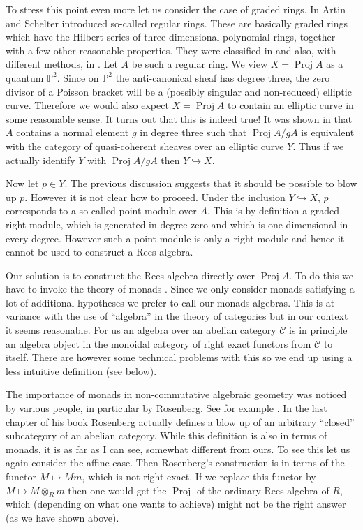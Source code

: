 \documentclass{amsproc}
\def \PP{{\mathbb P}}
\def\Cscr{{\mathcal C}}
\def\Proj{\operatorname {Proj}}
\theoremstyle{definition}
\theoremstyle{remark}
\numberwithin{equation}{section}
\numberwithin{table}{section}
\numberwithin{figure}{section}
\begin{document}
To stress this point even more let us consider the case of graded
rings. In \cite{AS} Artin and Schelter introduced so-called regular
rings. These are basically graded rings which have the Hilbert series
of three dimensional polynomial rings, together with a few other
reasonable properties. They were classified in \cite{AS,ATV1,ATV2} and
also, with different methods, in \cite{Bondal}. Let $A$ be such a
regular ring. We view $X= \Proj A$ as a quantum $\PP^2$. Since
on $\PP^2$ the anti-canonical sheaf has degree three, the zero divisor
of a Poisson bracket will be a (possibly singular and non-reduced)
elliptic curve. Therefore we would also expect $X=\Proj A$ to contain
an elliptic curve in some reasonable sense. It turns out that this is
indeed true!  It was shown in \cite{AS,AVdB,ATV1} that $A$
contains a normal element $g$ in degree three such that $\Proj A/gA$
is equivalent with the category of quasi-coherent sheaves over an
elliptic curve $Y$. Thus if we actually identify $Y$ with $\Proj A/gA$
then $Y\hookrightarrow X$.

Now let $p\in Y$. The previous discussion suggests that it should be
possible to blow up $p$. However it is not clear how to proceed. Under
the inclusion $Y\hookrightarrow X$, $p$ corresponds to a so-called
point module \cite{ATV2} over $A$. This is by definition a graded
right module, which is generated in degree zero and which is
one-dimensional in every degree. However such a point module is only a
right module and hence it cannot be used to construct a Rees algebra.

Our solution is to construct the Rees algebra directly over $\Proj A$.
To do this we have to invoke the theory of monads \cite{ML}. Since we
only consider monads satisfying a lot of additional hypotheses we
prefer to call our monads algebras. This is at variance with
the use of ``algebra'' in the theory of categories \cite{ML} but in
our context it seems reasonable. For us an algebra over an abelian
category $\Cscr$ is in principle an algebra object in the monoidal
category of right exact functors from $\Cscr$ to itself. There are
however some technical problems with this so  we end up using a
less intuitive definition (see below).


The importance of monads in non-commutative algebraic geometry was
noticed by various people, in particular by Rosenberg. See for example
\cite{rosenberg,RL}. In the last chapter of his book Rosenberg
actually defines a blow up of an arbitrary ``closed'' subcategory of
an abelian category. While this definition is also in terms of monads,
it is as far as I can see, somewhat different from ours. To see this
let us again consider the affine case. Then Rosenberg's construction
is in terms of the functor $M\mapsto Mm$, which is not right exact. If
we replace this functor by $M\mapsto M\otimes_R m$ then one would get
the $\Proj$ of the ordinary Rees algebra of $R$, which (depending on
what one wants to achieve) might not be the right answer (as we have
shown above).
\end{document}
